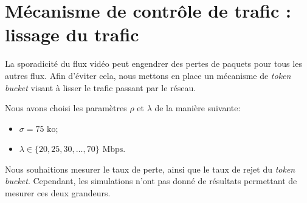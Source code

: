 \section{Mécanisme de contrôle de trafic : lissage du trafic}

La sporadicité du flux vidéo peut engendrer des pertes de paquets pour tous les
autres flux.  Afin d'éviter cela, nous mettons en place un mécanisme de
\textit{token bucket} visant à lisser le trafic passant par le réseau.

Nous avons choisi les paramètres $\rho$ et $\lambda$ de la manière suivante:
\begin{itemize}
	\item $\sigma = 75\text{ ko}$;
	\item $\lambda \in \{ 20, 25, 30, \dotsc, 70 \}\text{ Mbps}$.
\end{itemize}

Nous souhaitions mesurer le taux de perte, ainsi que le taux de rejet du
\textit{token bucket}.  Cependant, les simulations n'ont pas donné de résultats
permettant de mesurer ces deux grandeurs.

